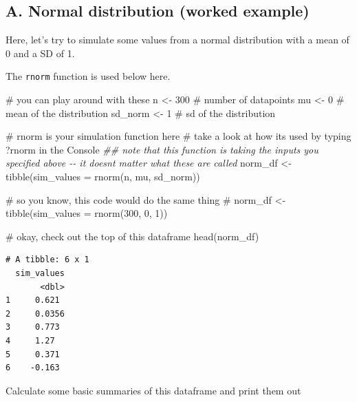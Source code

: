 \documentclass[
  letterpaper,
  DIV=11,
  numbers=noendperiod]{scrartcl}
\newenvironment{Shaded}{\begin{snugshade}}{\end{snugshade}}
\newcommand{\AttributeTok}[1]{\textcolor[rgb]{0.40,0.45,0.13}{#1}}
\newcommand{\CommentTok}[1]{\textcolor[rgb]{0.37,0.37,0.37}{#1}}
\newcommand{\DecValTok}[1]{\textcolor[rgb]{0.68,0.00,0.00}{#1}}
\newcommand{\DocumentationTok}[1]{\textcolor[rgb]{0.37,0.37,0.37}{\textit{#1}}}
\newcommand{\FunctionTok}[1]{\textcolor[rgb]{0.28,0.35,0.67}{#1}}
\newcommand{\NormalTok}[1]{\textcolor[rgb]{0.00,0.23,0.31}{#1}}
\newcommand{\OtherTok}[1]{\textcolor[rgb]{0.00,0.23,0.31}{#1}}
\begin{document}
\subsection{A. Normal distribution (worked
example)}\label{a.-normal-distribution-worked-example}

Here, let's try to simulate some values from a normal distribution with
a mean of 0 and a SD of 1.

The \texttt{rnorm} function is used below here.

\begin{Shaded}
\begin{Highlighting}[]
\CommentTok{\# you can play around with these}
\NormalTok{n }\OtherTok{\textless{}{-}} \DecValTok{300} \CommentTok{\# number of datapoints}
\NormalTok{mu }\OtherTok{\textless{}{-}} \DecValTok{0} \CommentTok{\# mean of the distribution}
\NormalTok{sd\_norm }\OtherTok{\textless{}{-}} \DecValTok{1} \CommentTok{\# sd of the distribution}

\CommentTok{\# rnorm is your simulation function here}
\CommentTok{\# take a look at how it\textquotesingle{}s used by typing \textasciigrave{}?rnorm\textasciigrave{} in the Console}
\DocumentationTok{\#\# note that this function is taking the inputs you specified above {-}{-} it doesn\textquotesingle{}t matter what these are called}
\NormalTok{norm\_df }\OtherTok{\textless{}{-}} \FunctionTok{tibble}\NormalTok{(}\AttributeTok{sim\_values =} \FunctionTok{rnorm}\NormalTok{(n, mu, sd\_norm))}

\CommentTok{\# so you know, this code would do the same thing}
\CommentTok{\# norm\_df \textless{}{-} tibble(sim\_values = rnorm(300, 0, 1))}

\CommentTok{\# okay, check out the top of this dataframe}
\FunctionTok{head}\NormalTok{(norm\_df)}
\end{Highlighting}
\end{Shaded}

\begin{verbatim}
# A tibble: 6 x 1
  sim_values
       <dbl>
1     0.621 
2     0.0356
3     0.773 
4     1.27  
5     0.371 
6    -0.163 
\end{verbatim}

Calculate some basic summaries of this dataframe and print them out
\end{document}

